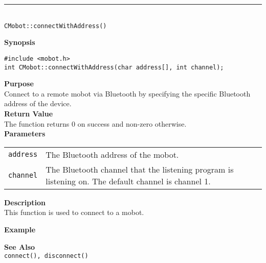 \noindent
\vspace{5pt}
\rule{4.5in}{0.015in} \\
\noindent
{\LARGE \texttt{CMobot::connectWithAddress()}}\\
{}

\noindent
{\bf Synopsis}
\vspace{-8pt}
\begin{verbatim}
#include <mobot.h>
int CMobot::connectWithAddress(char address[], int channel);
\end{verbatim}

\noindent
{\bf Purpose}\\
Connect to a remote mobot via Bluetooth by specifying the specific Bluetooth
address of the device.\\

\noindent
{\bf Return Value}\\
The function returns 0 on success and non-zero otherwise.\\

\noindent
{\bf Parameters}
\vspace{-0.1in}
\begin{description}
\item               
\begin{tabular}{p{10 mm}p{145 mm}}
\texttt{address} & The Bluetooth address of the mobot. \\
\texttt{channel} & The Bluetooth channel that the listening program is
listening on. The default channel is channel 1. \\
\end{tabular}
\end{description}

\noindent
{\bf Description}\\
This function is used to connect to a mobot. 

\noindent
{\bf Example}\\
\noindent

\noindent
{\bf See Also}\\
\texttt{connect(), disconnect()}

